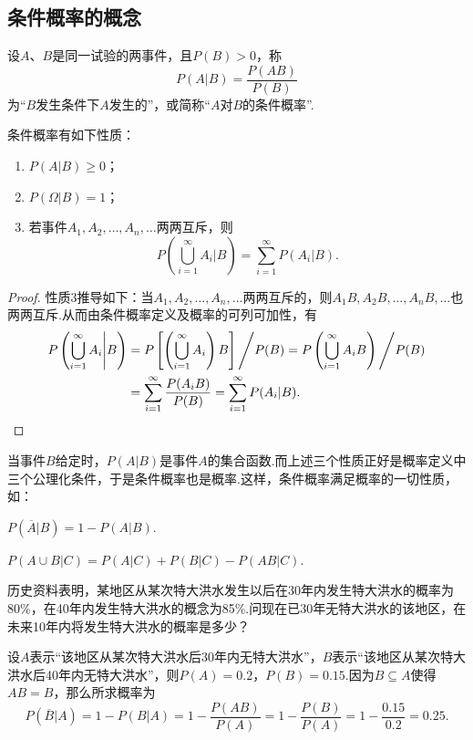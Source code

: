 \subsection{条件概率的概念}
\begin{definition}
设\(A\)、\(B\)是同一试验的两事件，且\(P(B) > 0\)，称\[
P(A \vert B) = \frac{P(AB)}{P(B)}
\]为“\(B\)发生条件下\(A\)发生的”，或简称“\(A\)对\(B\)的条件概率”.
\end{definition}

\begin{property}
条件概率有如下性质：\begin{enumerate}
\item \(P(A \vert B) \geq 0\)；
\item \(P(\Omega \vert B) = 1\)；
\item 若事件\(A_1,A_2,\dotsc,A_n,\dotsc\)两两互斥，则\[
P\left(\bigcup_{i=1}^\infty {A_i} \Bigg\vert B\right)
= \sum\limits_{i=1}^\infty {P(A_i \vert B)}.
\]
\end{enumerate}
\begin{proof}
性质3推导如下：当\(A_1,A_2,\dotsc,A_n,\dotsc\)两两互斥的，则\(A_1 B,A_2 B,\dotsc,A_n B,\dotsc\)也两两互斥.从而由条件概率定义及概率的可列可加性，有\begin{align*}
P\left(\bigcup_{i=1}^\infty {A_i} \Bigg\vert B\right)
&= P\left[\left(\displaystyle\bigcup_{i=1}^\infty {A_i}\right) B\right] \Bigg/ P(B)
= P\left(\displaystyle\bigcup_{i=1}^\infty {A_i B}\right) \Bigg/ P(B) \\
&= \sum\limits_{i=1}^\infty {\frac{P(A_i B)}{P(B)}}
= \sum\limits_{i=1}^\infty {P(A_i \vert B)}.
\qedhere
\end{align*}
\end{proof}
\end{property}

当事件\(B\)给定时，\(P(A \vert B)\)是事件\(A\)的集合函数.而上述三个性质正好是概率定义中三个公理化条件，于是条件概率也是概率.这样，条件概率满足概率的一切性质，如：

\begin{property}
\(P(\overline{A} \vert B) = 1 - P(A \vert B)\).
\end{property}

\begin{property}
\(P(A \cup B \vert C) = P(A \vert C) + P(B \vert C) - P(AB \vert C)\).
\end{property}

\begin{example}
历史资料表明，某地区从某次特大洪水发生以后在30年内发生特大洪水的概率为80\%，在40年内发生特大洪水的概念为85\%.问现在已30年无特大洪水的该地区，在未来10年内将发生特大洪水的概率是多少？
\begin{solution}
设\(A\)表示“该地区从某次特大洪水后30年内无特大洪水”，\(B\)表示“该地区从某次特大洪水后40年内无特大洪水”，则\(P(A) = 0.2\)，\(P(B) = 0.15\).因为\(B \subseteq A\)使得\(AB = B\)，那么所求概率为\[
P(\overline{B} \vert A)
= 1 - P(B \vert A)
= 1 - \frac{P(AB)}{P(A)}
= 1 - \frac{P(B)}{P(A)}
= 1 - \frac{0.15}{0.2}
= 0.25.
\]
\end{solution}
\end{example}

